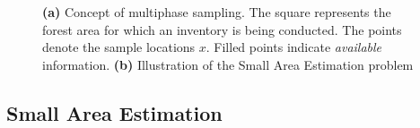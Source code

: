 \documentclass[article]{jss}
\begin{document}
\begin{figure}[htb]
	\begin{subfigure}[t]{0.5\textwidth} 
		\centering
		\caption{} \label{fig:concmphase_and_sae_a}
		\end{subfigure}
	\begin{subfigure}[t]{0.5\textwidth} 
		\centering
		\caption{} \label{fig:concmphase_and_sae_b}
	\end{subfigure}
\caption{\textbf{(a)} Concept of multiphase sampling. The square represents the forest area for which an inventory is being conducted. The points denote the sample locations $x$. Filled points indicate \textit{available} information. \textbf{(b)} Illustration of the Small Area Estimation problem}
\label{fig:concmphase_and_sae}
\end{figure}





% 



\subsection{Small Area Estimation}
\end{document}

